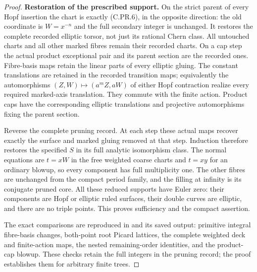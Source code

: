 \begin{proof}
\par\medskip\noindent\textbf{Restoration of the prescribed support.}
On the strict parent of every Hopf insertion the chart is
exactly (C.PR.6), in the opposite direction: the old coordinate
is $W=x^{-n}$ and the full secondary integer is unchanged.
It restores the complete recorded elliptic torsor, not just
its rational Chern class. All untouched charts and all
other marked fibres remain their recorded charts. On a cap
step the actual product exceptional pair and its parent
section are the recorded ones. Fibre-basis maps retain
the linear parts of every elliptic gluing. The constant
translations are retained in the recorded transition maps;
equivalently the automorphisms
$(Z,W)\mapsto(a^mZ,aW)$ of either Hopf contraction realize
every required marked-axis translation. They commute with
the finite action. Product caps have the corresponding
elliptic translations and projective automorphisms fixing
the parent section.

Reverse the complete pruning record. At each step these
actual maps recover exactly the surface and marked gluing
removed at that step. Induction therefore restores the
specified $S$ in its full analytic isomorphism class.
The normal equations are $t=xW$ in the free weighted
coarse charts and $t=xy$ for an ordinary blowup, so every
component has full multiplicity one. The other fibres
are unchanged from the compact period family, and the
filling at infinity is its conjugate pruned core.
All these reduced supports have Euler zero: their
components are Hopf or elliptic ruled surfaces, their
double curves are elliptic, and there are no triple points.
This proves sufficiency and the compact assertion.

The exact comparisons are reproduced in
 and its saved output:
primitive integral fibre-basis changes, both-point root Picard
lattices, the complete weighted deck and finite-action maps,
the nested remaining-order identities, and the product-cap
blowup. These checks retain the full integers in the pruning
record; the proof establishes them for arbitrary finite trees.
\end{proof}
